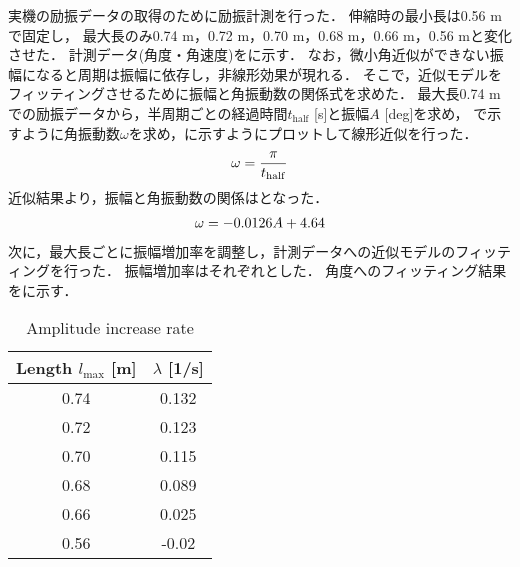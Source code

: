           実機の励振データの取得のために励振計測を行った．
          伸縮時の最小長は0.56 mで固定し，
          最大長のみ0.74 m，0.72 m，0.70 m，0.68 m，0.66 m，0.56 mと変化させた． 計測データ(角度・角速度)をに示す．    
          なお，微小角近似ができない振幅になると周期は振幅に依存し，非線形効果が現れる．
          そこで，近似モデルをフィッティングさせるために振幅と角振動数の関係式を求めた．
          最大長0.74 mでの励振データから，半周期ごとの経過時間$t_{\mathrm{half}}$ [s]と振幅$A$ [deg]を求め，
          で示すように角振動数$\omega$を求め，に示すようにプロットして線形近似を行った．
          \begin{eqnarray}
            \equlabel{T2omega}
            \omega=\frac{\pi}{t_{\mathrm{half}}}
          \end{eqnarray}
          近似結果より，振幅と角振動数の関係はとなった．
          \begin{eqnarray}
            \equlabel{A2ome}
            \omega=-0.0126A+4.64
          \end{eqnarray}
          次に，最大長ごとに振幅増加率を調整し，計測データへの近似モデルのフィッティングを行った．
          振幅増加率はそれぞれとした．
          角度へのフィッティング結果をに示す．
          \begin{table}[b]
            \begin{center}
              \caption{Amplitude increase rate}
              \vspace{2mm}
              \begin{tabular}{c|c}
                \hline
                Length $l_{\mathrm{max}}$ [m] & $\lambda$ [1/s] \\
                \hline
                0.74 &  0.132\\
                0.72 &  0.123\\
                0.70 &  0.115\\
                0.68 &  0.089\\
                0.66 &  0.025\\
                0.56 &  -0.02\\                       
                \hline
              \end{tabular}
            \end{center}
          \end{table}
